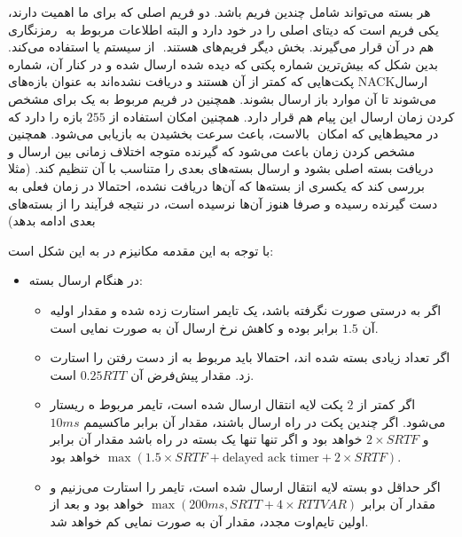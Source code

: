 \documentclass[12pt]{article}
\begin{document}
\begin{enumerate}
هر بسته می‌تواند شامل چندین فریم باشد. دو فریم اصلی که برای ما اهمیت دارند، یکی فریم  است که دیتای اصلی را در خود دارد و البته اطلاعات مربوط به ‌ رمزنگاری هم در آن قرار می‌گیرند. بخش دیگر فریم‌های  هستند. ‌ از سیستم  یا  استفاده می‌‌کند. بدین شکل که بیش‌ترین شماره پکتی که دیده شده ارسال شده و در کنار آن، شماره پکت‌هایی که کمتر از آن هستند و دریافت نشده‌اند به عنوان بازه‌های NACK‌ارسال می‌شوند تا آن موارد باز ارسال بشوند. همچنین در فریم مربوط به  یک  برای مشخص کردن زمان ارسال این پیام هم قرار دارد. همچنین  امکان استفاده از $255$ بازه  را دارد که در محیط‌هایی که امکان ‌ بالاست، باعث سرعت بخشیدن به بازیابی می‌شود. همچنین مشخص کردن زمان  باعث می‌شود که گیرنده  متوجه اختلاف زمانی بین ارسال  و دریافت بسته اصلی بشود و ارسال بسته‌های بعدی را متناسب با آن تنظیم کند. (مثلا بررسی کند که یکسری از بسته‌ها که  آن‌ها دریافت نشده، احتمالا در زمان فعلی به دست گیرنده رسیده و صرفا هنوز  آن‌ها نرسیده است، در نتیجه فرآیند را از بسته‌های بعدی ادامه بدهد)

با توجه به این مقدمه مکانیزم  در  به این شکل است:

\begin{itemize}
	\item در هنگام ارسال بسته:
	
	\begin{itemize}
		\item اگر  به درستی صورت نگرفته باشد، یک تایمر استارت زده شده و مقدار اولیه آن $1.5$ برابر  بوده و کاهش نرخ ارسال آن به صورت نمایی است.
		
		\item
		
		اگر تعداد زیادی بسته  شده اند، احتمالا باید  مربوط به از دست رفتن را استارت زد. مقدار پیش‌فرض آن $0.25 RTT$ است.
		
		\item
		
		اگر کمتر از $2$ پکت لایه انتقال ارسال شده است، تایمر مربوط ه ریستار می‌شود. اگر چندین پکت در راه ارسال باشند، مقدار آن برابر ماکسیمم $10ms$ و $2 \times SRTF$ خواهد بود و اگر تنها تنها یک بسته در راه باشد مقدار آن برابر
		$\max(1.5\times SRTF + \text{delayed ack timer} + 2\times SRTF)$
		خواهد بود.
		
		\item
		
		اگر حداقل دو بسته لایه انتقال ارسال شده است، تایمر  را استارت می‌زنیم و مقدار آن برابر
		$\max(200ms , SRTT + 4 \times RTTVAR)$
		خواهد بود و بعد از اولین تایم‌اوت مجدد، مقدار آن به صورت نمایی کم خواهد شد.
	\end{itemize}



\end{itemize}
\end{enumerate}
\end{document}
